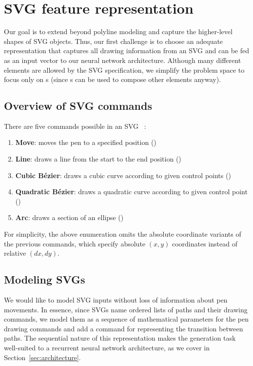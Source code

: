 \chapter{SVG feature representation}
Our goal is to extend beyond polyline modeling and capture the higher-level shapes of SVG objects.
Thus, our first challenge is to choose an adequate representation that captures all drawing information from an SVG and can be fed as an input vector to our neural network architecture.
Although many different elements are allowed by the SVG specification, we simplify the problem space to focus only on s (since s can be used to compose other elements anyway). 

\section{Overview of SVG commands}
There are five commands possible in an SVG ~\cite{grasso2011svg}:

\begin{enumerate}
    \item \textbf{Move}: moves the pen to a specified position ()
    \item \textbf{Line}: draws a line from the start to the end position ()
    \item \textbf{Cubic B\'ezier}: draws a cubic curve according to given control points ()
    \item \textbf{Quadratic B\'ezier}: draws a quadratic curve according to given control point ()
    \item \textbf{Arc}: draws a section of an ellipse ()
\end{enumerate}

For simplicity, the above enumeration omits the absolute coordinate variants of the previous commands, which specify absolute $(x, y)$ coordinates instead of relative $(dx, dy)$.

\section{Modeling SVGs}
We would like to model SVG inputs without loss of information about pen movements.
In essence, since SVGs name ordered lists of paths and their drawing commands, we model them as a sequence of mathematical parameters for the pen drawing commands and add a command for representing the transition between paths.
The sequential nature of this representation makes the generation task well-suited to a recurrent neural network architecture, as we cover in Section~\ref{sec:architecture}.

